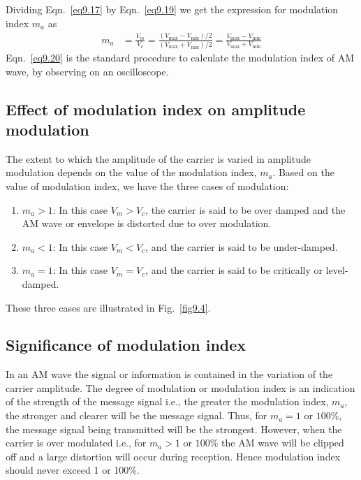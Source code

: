 Dividing Eqn.~\eqref{eq9.17} by Eqn.~\eqref{eq9.19} we get the expression for modulation index $m_{a}$ as
\begin{align}
m_{a} &= \frac{V_{m}}{V_{c}}=\frac{(V_{\max}-V_{\min})/2}{(V_{\max}+V_{\min})/2}
= \frac{V_{\max}-V_{\min}}{V_{\max}+V_{\min}}\label{eq9.20}
\end{align}
Eqn.~\eqref{eq9.20} is the standard procedure to calculate the modulation index of AM wave, by observing on an oscilloscope.

\subsection{Effect of modulation index on amplitude modulation}\label{sec9.10.1}

The extent to which the amplitude of the carrier is varied in amplitude modulation depends on the value of the modulation index, $m_{a}$. Based on the value of modulation index, we have the three cases of modulation:
\begin{enumerate}
\itemsep=0pt
\item $m_{a}>1$: In this case $V_{m}>V_{c}$, the carrier is said to be over damped and the AM wave or envelope is distorted due to over modulation.

\item $m_{a}<1$: In this case $V_{m}<V_{c}$, and the carrier is said to be under-damped.

\item $m_{a}=1$: In this case $V_{m}=V_{c}$, and the carrier is said to be critically or level-damped.
\end{enumerate}
These three cases are illustrated in Fig.~\ref{fig9.4}.\\[-20pt]

\subsection{Significance of modulation index}\label{sec9.10.2}

In an AM wave the signal or information is contained in the variation of the carrier amplitude. The degree of modulation or modulation index is an indication of the strength of the message signal i.e., the greater the modulation index, $m_{a}$, the stronger and clearer will be the message signal. Thus, for $m_{a}=1$ or $100\%$, the message signal being transmitted will be the strongest. However, when the carrier is over modulated i.e., for $m_{a}>1$ or $100\%$ the AM wave will be clipped off and a large distortion will occur during reception. Hence modulation index should never exceed 1 or 100\%.\\[-20pt]

